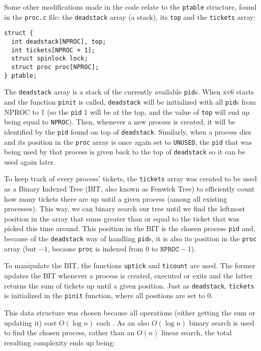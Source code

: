 \documentclass[12pt]{article}
\begin{document}
Some other modifications made in the code relate to the \texttt{ptable}
structure, found in the \texttt{proc.c} file: the \texttt{deadstack}
array (a stack), its \texttt{top} and the \texttt{tickets} array:

\begin{scriptsize}
\begin{verbatim}
struct {
  int deadstack[NPROC], top;
  int tickets[NPROC + 1];
  struct spinlock lock;
  struct proc proc[NPROC];
} ptable;
\end{verbatim}
\end{scriptsize}

The \texttt{deadstack} array is a stack of the currently available
\texttt{pid}s. When xv6 starts and the function \texttt{pinit} is
called, \texttt{deadstack} will be initialized with all \texttt{pid}s
from NPROC to 1 (so the \texttt{pid} 1 will be at the top, and
the value of \texttt{top} will end up being equal to
\texttt{NPROC}). Then, whenever a new process is created, it will be
identified by the \texttt{pid} found on top of \texttt{deadstack}. Similarly, when a
process dies and its position in the \texttt{proc} array is once again set to
\texttt{UNUSED}, the \texttt{pid} that was being used by that process is
given back to the top of \texttt{deadstack} so it can be used
again later.

To keep track of every process' tickets, the \texttt{tickets} array was
created to be used as a Binary Indexed Tree (BIT, also known as Fenwick
Tree) to efficiently count how many tickets there are up until a given
process (among all existing processes). This way, we can binary search
our tree until we find the leftmost position in the array that
sums greater than or equal to the ticket that was picked this time
around. This position in the BIT is the chosen process \texttt{pid} and,
because of the \texttt{deadstack} way of handling \texttt{pid}s, it is
also its position in the \texttt{proc} array (but $- 1$, because
\texttt{proc} is indexed from 0 to $\texttt{NPROC} - 1$).

To manipulate the BIT, the functions \texttt{uptick} and
\texttt{ticount} are used. The former updates the BIT whenever a process is
created, executed or exits and the latter returns the sum of tickets up
until a given position. Just as \texttt{deadstack}, \texttt{tickets} is
initialized in the \texttt{pinit} function, where all positions are set
to 0.

This data structure was chosen because all operations (either getting the
sum or updating it) cost $O(\log n)$ each \cite{halim:13}. As an also
$O(\log n)$ binary search is used to find the chosen process, rather
than an $O(n)$ linear search, the total resulting complexity ends up being:
\end{document}
